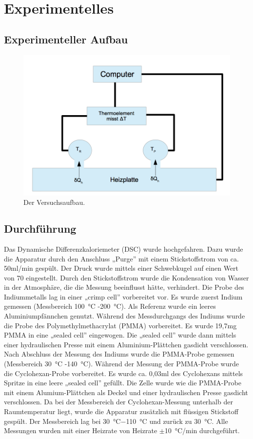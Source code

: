 \documentclass[12pt,a4paper,titlepage,headinclude,bibtotoc]{scrartcl}
\begin{document}
\section{Experimentelles}
\subsection{Experimenteller Aufbau}
\begin{figure}[h]
\centering
\includegraphics[width=13.5cm]{VB_SN.png}
\caption{Der Versuchsaufbau.}
\end{figure} 
\FloatBarrier

\newpage
\subsection{Durchführung}
Das Dynamische Differenzkaloriemeter (DSC) wurde hochgefahren. Dazu wurde die Apparatur durch den Anschluss „Purge” \;mit einem Stickstoffstrom von ca. 50\;ml/min gespült. Der Druck wurde mittels einer Schwebkugel auf einen Wert von 70 eingestellt. Durch den Stickstoffstrom wurde die Kondensation von Wasser in der Atmosphäre, die die Messung beeinflusst hätte, verhindert. Die Probe des Indiummetalls lag in einer „crimp cell” \;vorbereitet vor. Es wurde zuerst Indium gemessen (Messbereich 100~°C -200~°C). Als Referenz wurde ein leeres Aluminiumpfännchen genutzt. Während des Messdurchgangs des Indiums wurde die Probe des Polymethylmethacrylat (PMMA) vorbereitet. Es wurde 19,7\;mg PMMA in eine „sealed cell” \;eingewogen. Die „sealed cell” \;wurde dann mittels einer hydraulischen Presse mit einem Aluminium-Plättchen gasdicht verschlossen. Nach Abschluss der Messung des Indiums wurde die PMMA-Probe gemessen (Messbereich 30~°C -140~°C). Während der Messung der PMMA-Probe wurde die Cyclohexan-Probe vorbereitet. Es wurde ca. 0,03\;ml des Cyclohexans mittels Spritze in eine leere „sealed cell” \;gefüllt. Die Zelle wurde wie die PMMA-Probe mit einem Alumium-Plättchen als Deckel und einer hydraulischen Presse gasdicht verschlossen. Da bei der Messbereich der Cyclohexan-Messung unterhalb der Raumtemperatur liegt, wurde die Apparatur zusätzlich mit flüssigen Stickstoff gespült. Der Messbereich lag bei 30~°C$-$110~°C und zurück zu 30~°C. Alle Messungen wurden mit einer Heizrate von Heizrate $\pm$10~°C/min durchgeführt.\\
\end{document}
